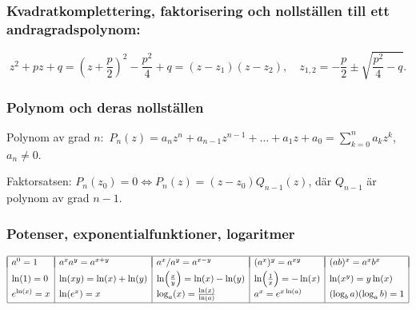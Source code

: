 \documentclass{article}
\begin{document}
\subsubsection*{Kvadratkomplettering, faktorisering och nollställen till ett andragradspolynom:}%
   \[
z^2+pz+q
  =\left(z+\frac{p}{2}\right)^2-\frac{p^2}{4}+q
  =(z-z_1)(z-z_2)
  ,\quad
  z_{1,2}=-\frac{p}{2}\pm\sqrt{\frac{p^2}{4}-q}.
\]

\vspace{-1em}

\subsubsection*{Polynom och deras nollställen} %
Polynom av grad $n$:\, $P_n(z)
   =a_nz^n+a_{n-1}z^{n-1}+\dots+a_1z+a_0
   =\sum_{k=0}^n a_kz^k$, 
   $a_n\neq 0$.

Faktorsatsen: $P_n(z_0)=0 \iff P_n(z) = (z-z_0)Q_{n-1}(z)$, där $Q_{n-1}$ är
polynom av grad $n-1$.


\subsubsection*{Potenser, exponentialfunktioner, logaritmer}%


$\begin{array}{|l|l|l|l|l|}\hline
  &&&&\\*[-11pt]
  a^0=1 &a^xa^y=a^{x+y} &
  a^x/a^y=a^{x-y}&(a^x)^y=a^{xy} 
  & (ab)^x=a^xb^x 
\EndRow
  \ln(1)=0 &\ln(xy)=\ln(x)+\ln(y) &\ln\Bigl(\frac{x}{y}\Bigr)
  =\ln(x)-\ln(y) & 
  \ln\Bigl(\frac1x\Bigr) = -\ln(x) &
  \ln(x^y)=y\ln(x) 
\EndRow 
  e^{\ln(x)}=x & \ln(e^x)=x & \log_a(x)
  =\frac{\ln(x)}{\ln(a)} & a^x=e^{x\ln(a)} & 
  (\log_ba)(\log_ab) = 1
\EndRow
\hline\end{array}$%
\end{document}
